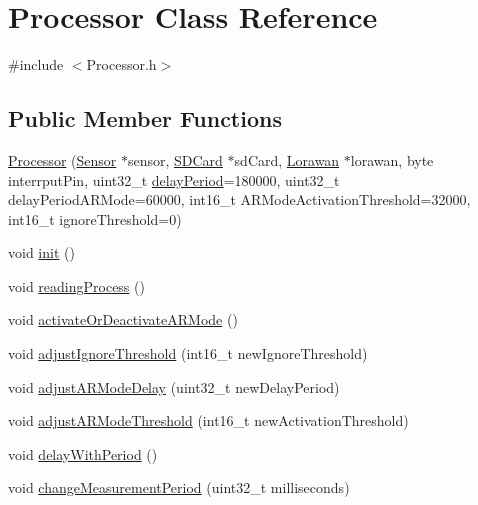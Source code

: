 \hypertarget{class_processor}{}\section{Processor Class Reference}
\label{class_processor}


{\ttfamily \#include $<$Processor.\+h$>$}

\subsection*{Public Member Functions}
\begin{DoxyCompactItemize}
\item 
\mbox{\hyperlink{class_processor_ad7a36124dd65e3ef07efb2e3fc5e7a70}{Processor}} (\mbox{\hyperlink{class_sensor}{Sensor}} $\ast$sensor, \mbox{\hyperlink{class_s_d_card}{S\+D\+Card}} $\ast$sd\+Card, \mbox{\hyperlink{class_lorawan}{Lorawan}} $\ast$lorawan, byte interrput\+Pin, uint32\+\_\+t \mbox{\hyperlink{class_processor_a3d4df57c57607d2ed3ad9f2d4ff3e789}{delay\+Period}}=180000, uint32\+\_\+t delay\+Period\+A\+R\+Mode=60000, int16\+\_\+t A\+R\+Mode\+Activation\+Threshold=32000, int16\+\_\+t ignore\+Threshold=0)
\item 
void \mbox{\hyperlink{class_processor_a22e869ee49d974ad0ee7ee81961ab88f}{init}} ()
\item 
void \mbox{\hyperlink{class_processor_a694b889c3c6f8c09b998b4012d304d6e}{reading\+Process}} ()
\item 
void \mbox{\hyperlink{class_processor_a9316beb5903476939018dce45e992c53}{activate\+Or\+Deactivate\+A\+R\+Mode}} ()
\item 
void \mbox{\hyperlink{class_processor_a4b4e65040fd7bc17e978412c1af8e0c8}{adjust\+Ignore\+Threshold}} (int16\+\_\+t new\+Ignore\+Threshold)
\item 
void \mbox{\hyperlink{class_processor_a5b6762cf2679f4f47365aacb47b59ef5}{adjust\+A\+R\+Mode\+Delay}} (uint32\+\_\+t new\+Delay\+Period)
\item 
void \mbox{\hyperlink{class_processor_a58a2f6a482491cb003f4ff1bd45ba891}{adjust\+A\+R\+Mode\+Threshold}} (int16\+\_\+t new\+Activation\+Threshold)
\item 
void \mbox{\hyperlink{class_processor_a6ad79126a7694ed86f3f5ccc36b606bd}{delay\+With\+Period}} ()
\item 
void \mbox{\hyperlink{class_processor_a8759b7d9dc2d5f63fa9ca08f9211fd77}{change\+Measurement\+Period}} (uint32\+\_\+t milliseconds)
\item 

\end{DoxyCompactItemize}
